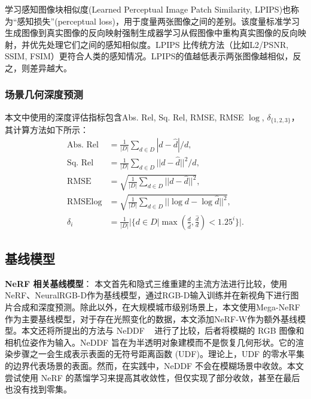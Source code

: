 学习感知图像块相似度(Learned Perceptual Image Patch Similarity, LPIPS)\cite{zhang_unreasonable_2018}也称为“感知损失”(perceptual loss)，用于度量两张图像之间的差别。该度量标准学习生成图像到真实图像的反向映射强制生成器学习从假图像中重构真实图像的反向映射，并优先处理它们之间的感知相似度。LPIPS 比传统方法（比如L2/PSNR, SSIM, FSIM）更符合人类的感知情况。LPIPS的值越低表示两张图像越相似，反之，则差异越大。

\subsubsection{场景几何深度预测}
本文中使用的深度评估指标\cite{wang_regularizing_2021}包含Abs. Rel, Sq. Rel, RMSE, RMSE $\log$, $\delta_{\{1,2,3\}}$，其计算方法如下所示：
\begin{align}
    \text{Abs. Rel} &= \frac{1}{|D|}\sum_{d\in D} |d - \hat{d}| / d,\\
    \text{Sq. Rel} &= \frac{1}{|D|}\sum_{d\in D} ||d - \hat{d}||^2 / d,\\
    \text{RMSE} &= \sqrt{\frac{1}{|D|}\sum_{d\in D} ||d - \hat{d}||^2},\\
    \text{RMSE} \log &= \sqrt{\frac{1}{|D|}\sum_{d\in D} ||\log d - \log\hat{d}||^2},\\
    \delta_i &= \frac{1}{|D|}|\{d\in D | \max(\frac{d}{\hat{d}}, \frac{\hat{d}}{d}) < 1.25^i\}|.
\end{align}









\subsection{基线模型}

\textbf{NeRF 相关基线模型}：
本文首先和隐式三维重建的主流方法进行比较，使用NeRF\cite{mildenhall_nerf_2020}、NeuralRGB-D\cite{azinovic_neural_2022}作为基线模型，通过RGB-D输入训练并在新视角下进行图片合成和深度预测。除此以外，在大规模城市级别场景上，本文使用Mega-NeRF\cite{turki_mega-nerf_2022}作为主要基线模型，对于存在光照变化的数据，本文添加NeRF-W\cite{martin-brualla_nerf_2021}作为额外基线模型。本文还将所提出的方法与 NeDDF ~\cite{ueda_neural_2022} 进行了比较，后者将模糊的 RGB 图像和相机位姿作为输入。NeDDF 旨在为半透明对象建模而不是恢复几何形状。它的渲染步骤之一会生成表示表面的无符号距离函数 (UDF)。理论上，UDF 的零水平集的边界代表场景的表面。然而，在实践中，NeDDF 不会在模糊场景中收敛。本文尝试使用 NeRF 的蒸馏学习来提高其收敛性，但仅实现了部分收敛，甚至在最后也没有找到零集。

